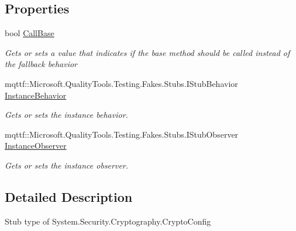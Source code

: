 \subsection*{Properties}
\begin{DoxyCompactItemize}
\item 
bool \hyperlink{class_system_1_1_security_1_1_cryptography_1_1_fakes_1_1_stub_crypto_config_add7882f68ff12ef36d899dd014345942}{Call\-Base}
\begin{DoxyCompactList}\small\item\em Gets or sets a value that indicates if the base method should be called instead of the fallback behavior\end{DoxyCompactList}\item 
mqttf\-::\-Microsoft.\-Quality\-Tools.\-Testing.\-Fakes.\-Stubs.\-I\-Stub\-Behavior \hyperlink{class_system_1_1_security_1_1_cryptography_1_1_fakes_1_1_stub_crypto_config_a7c42fa758a4d5f1720a7078f36997691}{Instance\-Behavior}
\begin{DoxyCompactList}\small\item\em Gets or sets the instance behavior.\end{DoxyCompactList}\item 
mqttf\-::\-Microsoft.\-Quality\-Tools.\-Testing.\-Fakes.\-Stubs.\-I\-Stub\-Observer \hyperlink{class_system_1_1_security_1_1_cryptography_1_1_fakes_1_1_stub_crypto_config_af5a1650f7d03de7abd7d1d4331c77184}{Instance\-Observer}
\begin{DoxyCompactList}\small\item\em Gets or sets the instance observer.\end{DoxyCompactList}\end{DoxyCompactItemize}


\subsection{Detailed Description}
Stub type of System.\-Security.\-Cryptography.\-Crypto\-Config



